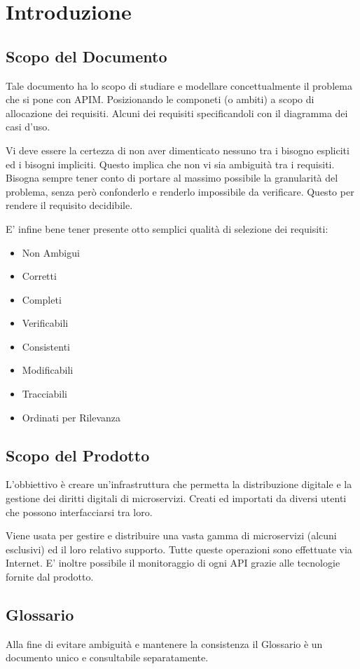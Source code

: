 \documentclass[12pt,a4paper,titlepage]{article}
\begin{document}
	
	
	\section{Introduzione}
	\subsection{Scopo del Documento}
	Tale documento ha lo scopo di studiare e modellare concettualmente il problema che si pone con APIM. Posizionando le componeti (o ambiti) a scopo di allocazione dei requisiti. Alcuni dei requisiti specificandoli con il diagramma dei casi d'uso.
	
	Vi deve essere la certezza di non aver dimenticato nessuno tra i bisogno espliciti ed i bisogni impliciti. Questo implica che non vi sia ambiguità tra i requisiti.
	Bisogna sempre tener conto di portare al massimo possibile la granularità del problema, senza però confonderlo e renderlo impossibile da verificare. Questo per rendere il requisito decidibile.
	
	E' infine bene tener presente otto semplici qualità di selezione dei requisiti:
	\begin{itemize}
		\item Non Ambigui
		\item Corretti
		\item Completi
		\item Verificabili
		\item Consistenti
		\item Modificabili
		\item Tracciabili
		\item Ordinati per Rilevanza
	\end{itemize}
	\subsection{Scopo del Prodotto}
	L'obbiettivo è creare un'infrastruttura che permetta la distribuzione digitale e la gestione dei diritti digitali di microservizi. Creati ed importati da diversi utenti che possono interfacciarsi tra loro.
	
	Viene usata per gestire e distribuire una vasta gamma di microservizi (alcuni esclusivi) ed il loro relativo supporto. Tutte queste operazioni sono effettuate via Internet.
	E' inoltre possibile il monitoraggio di ogni API grazie alle tecnologie fornite dal prodotto. 
	\subsection{Glossario}
	Alla fine di evitare ambiguità e mantenere la consistenza il Glossario è un documento unico e consultabile separatamente.
	
\end{document}
